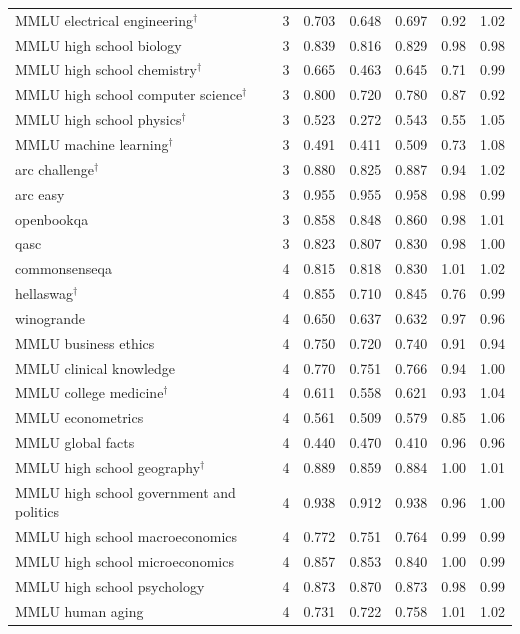 \begin{longtable}{lrrrrrr}
MMLU electrical engineering$^\dagger$ & 3 & 0.703 & 0.648 & 0.697 & 0.92 & 1.02 \\
MMLU high school biology & 3 & 0.839 & 0.816 & 0.829 & 0.98 & 0.98 \\
MMLU high school chemistry$^\dagger$ & 3 & 0.665 & 0.463 & 0.645 & 0.71 & 0.99 \\
MMLU high school computer science$^\dagger$ & 3 & 0.800 & 0.720 & 0.780 & 0.87 & 0.92 \\
MMLU high school physics$^\dagger$ & 3 & 0.523 & 0.272 & 0.543 & 0.55 & 1.05 \\
MMLU machine learning$^\dagger$ & 3 & 0.491 & 0.411 & 0.509 & 0.73 & 1.08 \\
arc challenge$^\dagger$ & 3 & 0.880 & 0.825 & 0.887 & 0.94 & 1.02 \\
arc easy & 3 & 0.955 & 0.955 & 0.958 & 0.98 & 0.99 \\
openbookqa & 3 & 0.858 & 0.848 & 0.860 & 0.98 & 1.01 \\
qasc & 3 & 0.823 & 0.807 & 0.830 & 0.98 & 1.00 \\
commonsenseqa & 4 & 0.815 & 0.818 & 0.830 & 1.01 & 1.02 \\
hellaswag$^\dagger$ & 4 & 0.855 & 0.710 & 0.845 & 0.76 & 0.99 \\
winogrande & 4 & 0.650 & 0.637 & 0.632 & 0.97 & 0.96 \\
MMLU business ethics & 4 & 0.750 & 0.720 & 0.740 & 0.91 & 0.94 \\
MMLU clinical knowledge & 4 & 0.770 & 0.751 & 0.766 & 0.94 & 1.00 \\
MMLU college medicine$^\dagger$ & 4 & 0.611 & 0.558 & 0.621 & 0.93 & 1.04 \\
MMLU econometrics & 4 & 0.561 & 0.509 & 0.579 & 0.85 & 1.06 \\
MMLU global facts & 4 & 0.440 & 0.470 & 0.410 & 0.96 & 0.96 \\
MMLU high school geography$^\dagger$ & 4 & 0.889 & 0.859 & 0.884 & 1.00 & 1.01 \\
MMLU high school government and politics & 4 & 0.938 & 0.912 & 0.938 & 0.96 & 1.00 \\
MMLU high school macroeconomics & 4 & 0.772 & 0.751 & 0.764 & 0.99 & 0.99 \\
MMLU high school microeconomics & 4 & 0.857 & 0.853 & 0.840 & 1.00 & 0.99 \\
MMLU high school psychology & 4 & 0.873 & 0.870 & 0.873 & 0.98 & 0.99 \\
MMLU human aging & 4 & 0.731 & 0.722 & 0.758 & 1.01 & 1.02 \\

\end{longtable}
